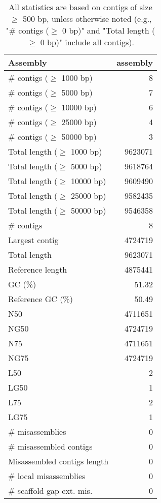 \documentclass[12pt,a4paper]{article}
\begin{document}
\begin{table}[ht]
\begin{center}
\caption{All statistics are based on contigs of size $\geq$ 500 bp, unless otherwise noted (e.g., "\# contigs ($\geq$ 0 bp)" and "Total length ($\geq$ 0 bp)" include all contigs).}
\begin{tabular}{|l*{1}{|r}|}
\hline
Assembly & assembly \\ \hline
\# contigs ($\geq$ 1000 bp) & 8 \\ \hline
\# contigs ($\geq$ 5000 bp) & 7 \\ \hline
\# contigs ($\geq$ 10000 bp) & 6 \\ \hline
\# contigs ($\geq$ 25000 bp) & 4 \\ \hline
\# contigs ($\geq$ 50000 bp) & 3 \\ \hline
Total length ($\geq$ 1000 bp) & 9623071 \\ \hline
Total length ($\geq$ 5000 bp) & 9618764 \\ \hline
Total length ($\geq$ 10000 bp) & 9609490 \\ \hline
Total length ($\geq$ 25000 bp) & 9582435 \\ \hline
Total length ($\geq$ 50000 bp) & 9546358 \\ \hline
\# contigs & 8 \\ \hline
Largest contig & 4724719 \\ \hline
Total length & 9623071 \\ \hline
Reference length & 4875441 \\ \hline
GC (\%) & 51.32 \\ \hline
Reference GC (\%) & 50.49 \\ \hline
N50 & 4711651 \\ \hline
NG50 & 4724719 \\ \hline
N75 & 4711651 \\ \hline
NG75 & 4724719 \\ \hline
L50 & 2 \\ \hline
LG50 & 1 \\ \hline
L75 & 2 \\ \hline
LG75 & 1 \\ \hline
\# misassemblies & 0 \\ \hline
\# misassembled contigs & 0 \\ \hline
Misassembled contigs length & 0 \\ \hline
\# local misassemblies & 0 \\ \hline
\# scaffold gap ext. mis. & 0 \\ \hline

\end{tabular}
\end{center}
\end{table}
\end{document}
